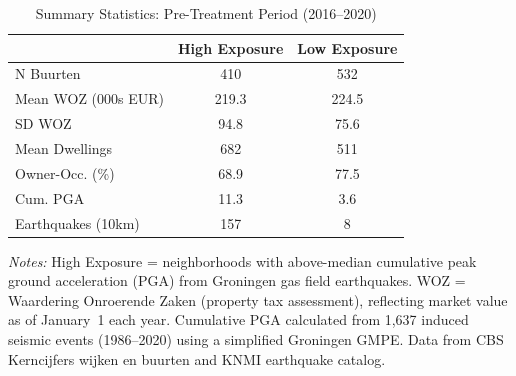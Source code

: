 \begin{table}[htbp]
\centering
\caption{Summary Statistics: Pre-Treatment Period (2016--2020)}
\label{tab:summary}
\begin{tabular}{lcc}
\hline\hline
 & High Exposure & Low Exposure \\
\hline
N Buurten & 410 & 532 \\
Mean WOZ (000s EUR) & 219.3 & 224.5 \\
SD WOZ & 94.8 & 75.6 \\
Mean Dwellings & 682 & 511 \\
Owner-Occ. (\%) & 68.9 & 77.5 \\
Cum. PGA & 11.3 & 3.6 \\
Earthquakes (10km) & 157 & 8 \\
\hline\hline
\end{tabular}
\begin{tablenotes}[flushleft]
\small
\item \textit{Notes:} High Exposure = neighborhoods with above-median cumulative peak ground acceleration (PGA) from Groningen gas field earthquakes. WOZ = Waardering Onroerende Zaken (property tax assessment), reflecting market value as of January~1 each year. Cumulative PGA calculated from 1,637 induced seismic events (1986--2020) using a simplified Groningen GMPE. Data from CBS Kerncijfers wijken en buurten and KNMI earthquake catalog.
\end{tablenotes}
\end{table}
